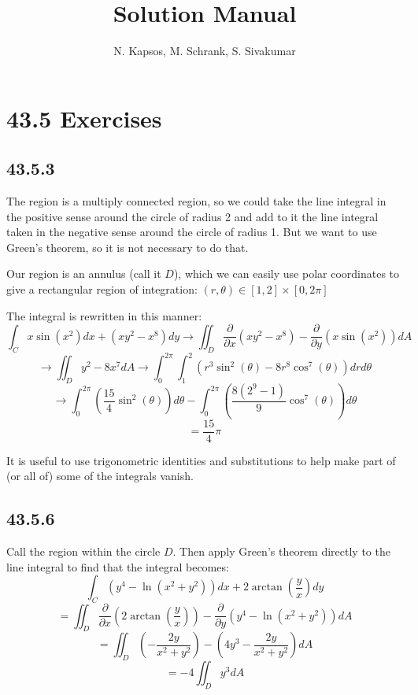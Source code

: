\documentclass{article}
\title{Solution Manual}
\author{N. Kapsos, M. Schrank, S. Sivakumar}
\date{}
\begin{document}
\maketitle
\setcounter{secnumdepth}{0}

\section{43.5 Exercises}

\subsection{43.5.3}

The region is a multiply connected region, so we could take the line integral in the positive sense around the circle of radius 2 and add to it the line integral taken in the negative sense around the circle of radius 1. But we want to use Green's theorem, so it is not necessary to do that.

Our region is an annulus (call it $D$), which we can easily use polar coordinates to give a rectangular region of integration: $(r,\theta) \in [1,2]\times[0,2\pi]$

The integral is rewritten in this manner:
$$\int_C x\sin(x^2)dx + (xy^2-x^8)dy \to \iint_D  \frac{\partial}{\partial x}\left(xy^2-x^8\right) - \frac{\partial}{\partial y}\left(x\sin(x^2) \right)dA $$
$$\to \iint_D y^2- 8x^7 dA \to \int_{0}^{2\pi}\int_1^2 \left(r^3\sin^2(\theta)-8r^8\cos^7(\theta)\right)drd\theta$$
$$\to \int_{0}^{2\pi}\left(\frac{15}{4}\sin^2(\theta)\right)d\theta - \int_{0}^{2\pi}\left(\frac{8(2^9-1)}{9}\cos^7(\theta)\right)d\theta$$
$$= \frac{15}{4}\pi$$

It is useful to use trigonometric identities and substitutions to help make part of (or all of) some of the integrals vanish.

\subsection{43.5.6}

Call the region within the circle $D$. Then apply Green's theorem directly to the line integral to find that the integral becomes:
$$\int_C (y^4-\ln(x^2+y^2))dx + 2\arctan\left(\frac{y}{x}\right)dy$$
$$ = \iint_D \frac{\partial}{\partial x}\left(2\arctan\left(\frac{y}{x}\right)\right) - \frac{\partial}{\partial y}\left(y^4-\ln(x^2+y^2)\right)dA$$
$$ = \iint_D \left(-\frac{2y}{x^2+y^2}\right) - \left(4y^3-\frac{2y}{x^2+y^2}\right)dA$$
$$ = -4\iint_D y^3 dA$$
\end{document}
